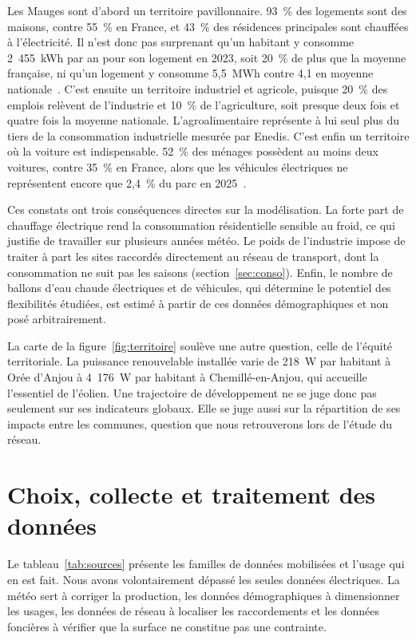 Les Mauges sont d'abord un territoire pavillonnaire. 93~\% des logements sont des maisons, contre 55~\% en France, et 43~\% des résidences principales sont chauffées à l'électricité. Il n'est donc pas surprenant qu'un habitant y consomme 2~455~kWh par an pour son logement en 2023, soit 20~\% de plus que la moyenne française, ni qu'un logement y consomme 5,5~MWh contre 4,1 en moyenne nationale~\cite{enedis_secteur}. C'est ensuite un territoire industriel et agricole, puisque 20~\% des emplois relèvent de l'industrie et 10~\% de l'agriculture, soit presque deux fois et quatre fois la moyenne nationale. L'agroalimentaire représente à lui seul plus du tiers de la consommation industrielle mesurée par Enedis. C'est enfin un territoire où la voiture est indispensable. 52~\% des ménages possèdent au moins deux voitures, contre 35~\% en France, alors que les véhicules électriques ne représentent encore que 2,4~\% du parc en 2025~\cite{sdes_ve}.

Ces constats ont trois conséquences directes sur la modélisation. La forte part de chauffage électrique rend la consommation résidentielle sensible au froid, ce qui justifie de travailler sur plusieurs années météo. Le poids de l'industrie impose de traiter à part les sites raccordés directement au réseau de transport, dont la consommation ne suit pas les saisons (section~\ref{sec:conso}). Enfin, le nombre de ballons d'eau chaude électriques et de véhicules, qui détermine le potentiel des flexibilités étudiées, est estimé à partir de ces données démographiques et non posé arbitrairement.

La carte de la figure~\ref{fig:territoire} soulève une autre question, celle de l'équité territoriale. La puissance renouvelable installée varie de 218~W par habitant à Orée d'Anjou à 4~176~W par habitant à Chemillé-en-Anjou, qui accueille l'essentiel de l'éolien. Une trajectoire de développement ne se juge donc pas seulement sur ses indicateurs globaux. Elle se juge aussi sur la répartition de ses impacts entre les communes, question que nous retrouverons lors de l'étude du réseau.

\section{Choix, collecte et traitement des données}
\label{sec:donnees}

Le tableau~\ref{tab:sources} présente les familles de données mobilisées et l'usage qui en est fait. Nous avons volontairement dépassé les seules données électriques. La météo sert à corriger la production, les données démographiques à dimensionner les usages, les données de réseau à localiser les raccordements et les données foncières à vérifier que la surface ne constitue pas une contrainte.

